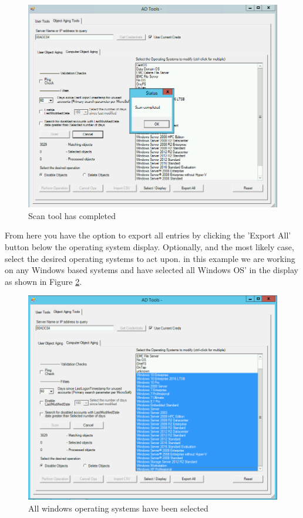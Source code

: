 \documentclass[12pt,a4paper,titlepage]{article}
\begin{document}
	\begin{figure}[h!]
		\centering
		\includegraphics[width=0.9\linewidth]{images/COT-scanning-complete}
		\caption{Scan tool has completed}
		\label{fig:cot-scanning-complete}
	\end{figure}
	
	From here you have the option to export all entries by clicking the 'Export All' button below the operating system display. Optionally, and the most likely case, select the desired operating systems to act upon. in this example we are working on any Windows based systems and have selected all Windows OS' in the display as shown in Figure \ref{fig:cot-selected}.
	
	\begin{figure}[h!]
		\centering
		\includegraphics[width=0.7\linewidth]{images/COT-selected}
		\caption{All windows operating systems have been selected}
		\label{fig:cot-selected}
	\end{figure}
	
\end{document}
